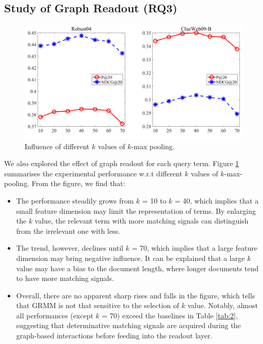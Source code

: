 \subsection{Study of Graph Readout (RQ3)}
\label{sec:featureelect}
\begin{figure}[h]
	\centering
	\includegraphics[width=.47\textwidth]{./pics/k.png}
	\caption{Influence of different $k$ values of $k$-max pooling.}
	\label{fig:5} 
\end{figure}

We also explored the effect of graph readout for each query term. Figure \ref{fig:5} summarises the experimental performance w.r.t different $k$ values of $k$-max-pooling. From the figure, we find that: 
\begin{itemize}
	\item The performance steadily grows from $k$ = 10 to $k$ = 40, which implies that a small feature dimension may limit the representation of terms. By enlarging the $k$ value, the relevant term with more matching signals can distinguish from the irrelevant one with less. 
	\item The trend, however, declines until $k$ = 70, which implies that a large feature dimension may bring negative influence. It can be explained that a large $k$ value may have a bias to the document length, where longer documents tend to have more matching signals. 
	\item Overall, there are no apparent sharp rises and falls in the figure, which tells that GRMM is not that sensitive to the selection of $k$ value. Notably, almost all performances (except $k$ = 70) exceed the baselines in Table \ref{tab:2}, suggesting that determinative matching signals are acquired during the graph-based interactions before feeding into the readout layer. 
\end{itemize}